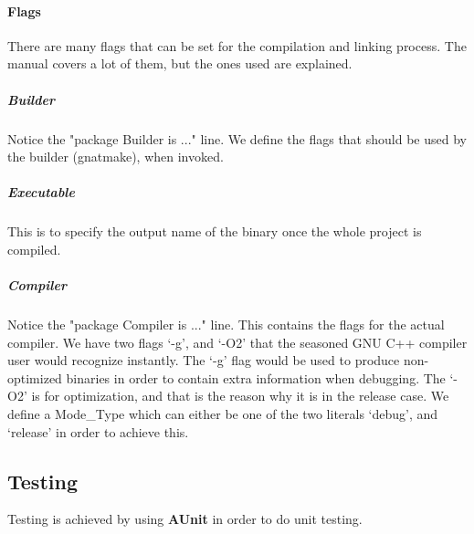 

\paragraph{Flags} There are many flags that can be set for the compilation and linking process. The manual covers a lot of them, but the ones used are explained.

\subparagraph{Builder} Notice the "package Builder is ..." line. We define the flags that should be used by the builder (gnatmake), when invoked.

\subparagraph{Executable} This is to specify the output name of the binary once the whole project is compiled.

\subparagraph{Compiler} Notice the "package Compiler is ..." line. This contains the flags for the actual compiler. We have two flags `-g', and `-O2' that the seasoned GNU C++ compiler user would recognize instantly. The `-g' flag would be used to produce non-optimized binaries in order to contain extra information when debugging. 
The `-O2' is for optimization, and that is the reason why it is in the release case. We define a Mode\_Type which can either be one of the two literals `debug', and `release' in order to achieve this. 

\subsection{Testing}
Testing is achieved by using \textbf{AUnit} in order to do unit testing. 